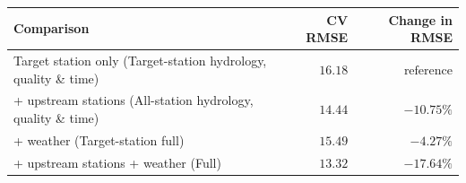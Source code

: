 \begin{tabularx}{\textwidth}{@{}Xrr@{}}
\toprule
\textbf{Comparison} & \textbf{CV RMSE} & \textbf{Change in RMSE} \\
\midrule
Target station only (Target-station hydrology, quality \& time) & $16.18$ & $\text{reference}$ \\
\addlinespace
+ upstream stations (All-station hydrology, quality \& time) & $14.44$ & $-10.75\%$ \\
\addlinespace
+ weather (Target-station full) & $15.49$ & $-4.27\%$ \\
\addlinespace
+ upstream stations + weather (Full) & $13.32$ & $-17.64\%$ \\
\bottomrule
\end{tabularx}
